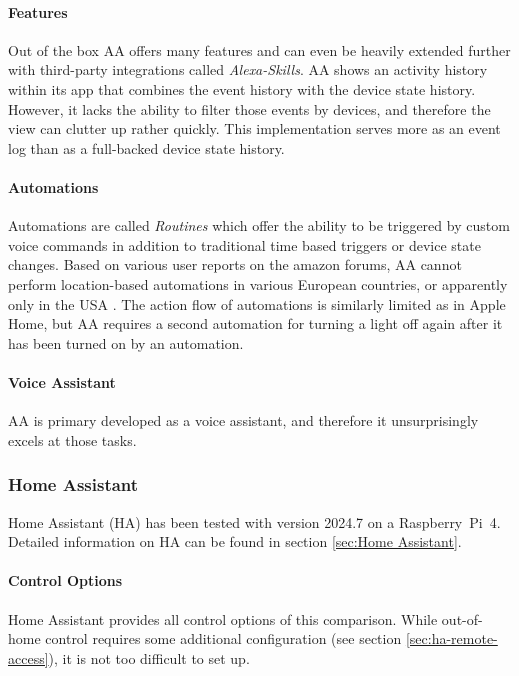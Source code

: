 \paragraph{Features}
Out of the box AA offers many features and can even be heavily extended further with third-party integrations called \textit{Alexa-Skills}.
AA shows an activity history within its app that combines the event history with the device state history. However, it lacks the ability to filter those events by devices, and therefore the view can clutter up rather quickly. This implementation serves more as an event log than as a full-backed device state history.


\paragraph{Automations}
Automations are called \textit{Routines} which offer the ability to be triggered by custom voice commands in addition to traditional time based triggers or device state changes.
Based on various user reports on the amazon forums, AA cannot perform location-based automations in various European countries, or apparently only in the USA \cite{Amazon_Forum2022LocationTrigger}.
The action flow of automations is similarly limited as in Apple Home, but AA requires a second automation for turning a light off again after it has been turned on by an automation.

\paragraph{Voice Assistant}
AA is primary developed as a voice assistant, and therefore it unsurprisingly excels at those tasks.

\newpage
\subsubsection{Home Assistant}
Home Assistant (HA) has been tested with version 2024.7 on a Raspberry~Pi~4. Detailed information on HA can be found in section \ref{sec:Home Assistant}.

\paragraph{Control Options}
Home Assistant provides all control options of this comparison. While out-of-home control requires some additional configuration (see section \ref{sec:ha-remote-access}), it is not too difficult to set up.

